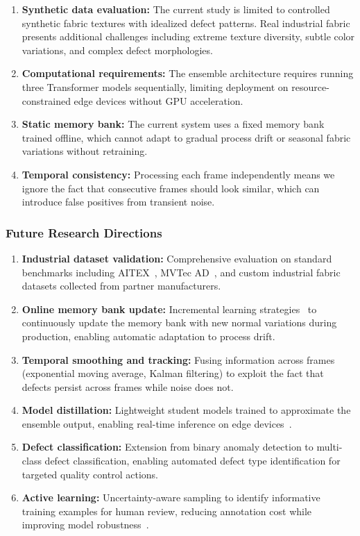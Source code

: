 \documentclass[journal]{IEEEtran}
\begin{document}
\begin{enumerate}[nosep]
    \item \textbf{Synthetic data evaluation:} The current study is limited to controlled synthetic fabric textures with idealized defect patterns. Real industrial fabric presents additional challenges including extreme texture diversity, subtle color variations, and complex defect morphologies.
    \item \textbf{Computational requirements:} The ensemble architecture requires running three Transformer models sequentially, limiting deployment on resource-constrained edge devices without GPU acceleration.
    \item \textbf{Static memory bank:} The current system uses a fixed memory bank trained offline, which cannot adapt to gradual process drift or seasonal fabric variations without retraining.
    \item \textbf{Temporal consistency:} Processing each frame independently means we ignore the fact that consecutive frames should look similar, which can introduce false positives from transient noise.
\end{enumerate}

\subsubsection{Future Research Directions}

\begin{enumerate}[nosep]
    \item \textbf{Industrial dataset validation:} Comprehensive evaluation on standard benchmarks including AITEX~\cite{silva2020aitex}, MVTec AD~\cite{bergmann2019mvtec}, and custom industrial fabric datasets collected from partner manufacturers.
    \item \textbf{Online memory bank update:} Incremental learning strategies~\cite{gunter2021sampling} to continuously update the memory bank with new normal variations during production, enabling automatic adaptation to process drift.
    \item \textbf{Temporal smoothing and tracking:} Fusing information across frames (exponential moving average, Kalman filtering) to exploit the fact that defects persist across frames while noise does not.
    \item \textbf{Model distillation:} Lightweight student models trained to approximate the ensemble output, enabling real-time inference on edge devices~\cite{liu2022efficient}.
    \item \textbf{Defect classification:} Extension from binary anomaly detection to multi-class defect classification, enabling automated defect type identification for targeted quality control actions.
    \item \textbf{Active learning:} Uncertainty-aware sampling to identify informative training examples for human review, reducing annotation cost while improving model robustness~\cite{park2023chexpert}.
\end{enumerate}
\end{document}
